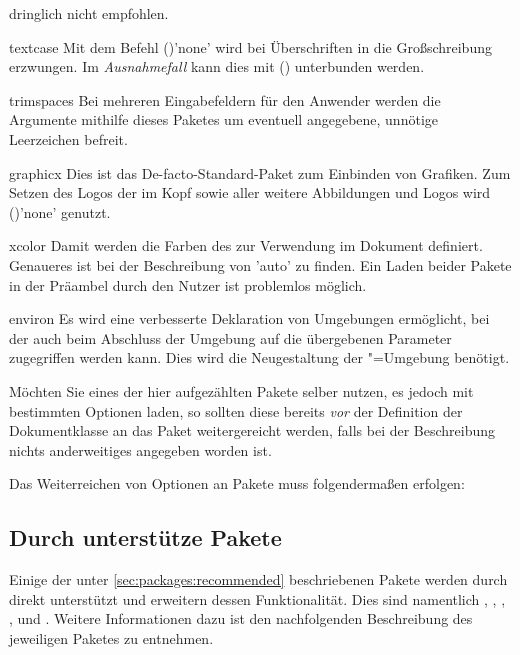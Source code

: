 \begin{packages}
  dringlich nicht empfohlen.
\item[textcase]
  Mit dem Befehl ()'none' wird bei
  Überschriften in \DIN die Großschreibung erzwungen. Im \emph{Ausnahmefall} 
  kann dies mit () unterbunden werden.
\item[trimspaces]
  Bei mehreren Eingabefeldern für den Anwender werden die Argumente mithilfe 
  dieses Paketes um eventuell angegebene, unnötige Leerzeichen befreit.
\item[graphicx]
  Dies ist das De-facto-Standard-Paket zum Einbinden von Grafiken. Zum Setzen 
  des Logos der \TnUD im Kopf sowie aller weitere Abbildungen und Logos wird 
  ()'none' genutzt.
\item[xcolor]
  Damit werden die Farben des \CDs zur Verwendung im Dokument definiert. 
  Genaueres ist bei der Beschreibung von 'auto' zu finden. 
  Ein Laden beider Pakete in der  Präambel durch den Nutzer ist problemlos 
  möglich.
\item[environ]
  Es wird eine verbesserte Deklaration von Umgebungen ermöglicht, bei der auch 
  beim Abschluss der Umgebung auf die übergebenen Parameter zugegriffen werden 
  kann. Dies wird die Neugestaltung der "=Umgebung 
  benötigt.
\end{packages}
%
Möchten Sie eines der hier aufgezählten Pakete selber nutzen, es jedoch mit 
bestimmten Optionen laden, so sollten diese bereits \emph{vor} der Definition 
der Dokumentklasse an das Paket weitergereicht werden, falls bei der 
Beschreibung nichts anderweitiges angegeben worden ist.
%
\begin{Example}
Das Weiterreichen von Optionen an Pakete muss folgendermaßen erfolgen:
\end{Example}



\subsection{Durch \TUDScript unterstütze Pakete}
%
Einige der unter \autoref{sec:packages:recommended} beschriebenen Pakete werden 
durch \TUDScript direkt unterstützt und erweitern dessen Funktionalität. Dies
sind namentlich , , , 
,  und . Weitere Informationen 
dazu ist den nachfolgenden Beschreibung des jeweiligen Paketes zu entnehmen.



